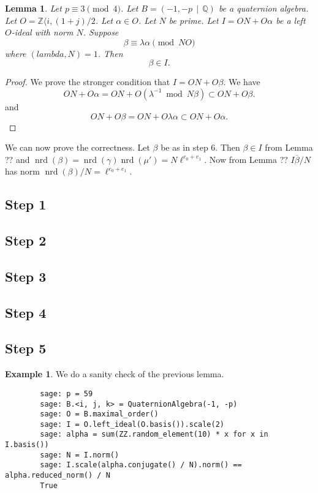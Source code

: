 \documentclass[10pt]{article}
\theoremstyle{plain}
\newtheorem{lemma}[theorem]{Lemma}
\theoremstyle{definition}
\newtheorem{example}[theorem]{Example}
\newcommand{\op}{\operatorname}
\newcommand{\Z}{\mathbb{Z}}
\newcommand{\Q}{\mathbb{Q}}
\newcommand{\nrd}{\op{nrd}}
\begin{document}
\begin{lemma}
    Let \( p \equiv 3 \pmod{4} \).
    Let \( B =  (-1, -p \, \mid \, \Q) \) be a quaternion algebra.
    Let \( O = \Z \langle i, (1+j) / 2 \).
    Let \( \alpha \in O \).
    Let \( N \) be prime.
    Let \( I = ON + O\alpha \) be a left \( O \)-ideal with norm \( N \).
    Suppose
    \[
        \beta \equiv \lambda \alpha \pmod{NO}
    \]
    where \( (lambda, N) = 1 \).
    Then
    \[
        \beta \in I.
    \]
\end{lemma}
\begin{proof}
    We prove the stronger condition that \( I = ON + O\beta \).
    We have
    \[
        ON + O\alpha
        = ON + O(\lambda^{-1} \bmod{N}\beta)
        \subset ON + O\beta .
    \]
    and
    \[
        ON + O\beta
        = ON + O\lambda \alpha
        \subset ON + O\alpha .
    \]
\end{proof}

We can now prove the correctness.
Let \( \beta \) be as in step 6.
Then \( \beta \in I \) from Lemma ?? and \( \nrd(\beta) = \nrd(\gamma) \nrd(\mu') = N\ell^{e_0 + e_1} \).
Now from Lemma ?? \( I\overline{\beta}/N \) has norm \( \nrd(\beta) / N = \ell^{e_0 + e_1} \).

\subsection{Step 1}
\subsection{Step 2}
\subsection{Step 3}
\subsection{Step 4}
\subsection{Step 5}




\begin{example}
    We do a sanity check of the previous lemma.
    \begin{lstlisting}
        sage: p = 59
        sage: B.<i, j, k> = QuaternionAlgebra(-1, -p)
        sage: O = B.maximal_order()
        sage: I = O.left_ideal(O.basis()).scale(2)
        sage: alpha = sum(ZZ.random_element(10) * x for x in I.basis())
        sage: N = I.norm()
        sage: I.scale(alpha.conjugate() / N).norm() == alpha.reduced_norm() / N
        True
    \end{lstlisting}
\end{example}
\end{document}
